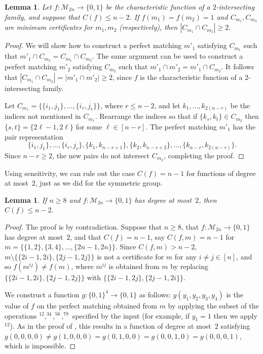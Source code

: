 \documentclass{article}
\newtheorem{lemma}[theorem]{Lemma}
\theoremstyle{definition}
\providecommand{\cM}{\mathcal{M}}
\begin{document}
\begin{lemma} \label{lem:2-int-coset-pms}
Let $f\colon \cM_{2n} \to \{0,1\}$ be the characteristic function of a $2$-intersecting family, and suppose that $C(f) \leq n-2$. If $f(m_1) = f(m_2) = 1$ and $C_{m_1},C_{m_2}$ are minimum certificates for $m_1,m_2$ (respectively), then $|C_{m_1} \cap C_{m_2}| \geq 2$.
\end{lemma}
\begin{proof}
We will show how to construct a perfect matching $m'_1$ satisfying $C_{m_1}$ such that $m'_1 \cap C_{m_2} = C_{m_1} \cap C_{m_2}$. The same argument can be used to construct a perfect matching $m'_2$ satisfying $C_{m_2}$ such that $m'_1 \cap m'_2 = m'_1 \cap C_{m_2}$. It follows that $|C_{m_1} \cap C_{m_2}| = |m'_1 \cap m'_2| \geq 2$, since $f$ is the characteristic function of a $2$-intersecting family.

Let $C_{m_1} = \bigl\{\{i_1,j_1\},\ldots,\{i_r,j_r\}\bigr\}$, where $r \leq n-2$, and let $k_1,\ldots,k_{2(n-r)}$ be the indices not mentioned in $C_{m_1}$. Rearrange the indices so that if $\{k_s,k_t\} \in C_{m_2}$ then $\{s,t\} = \{2\ell-1,2\ell\}$ for some $\ell \in [n-r]$. The perfect matching $m'_1$ has the pair representation
\[
 \{i_1,j_1\},\ldots,\{i_r,j_r\},\{k_1,k_{n-r+1}\},\{k_2,k_{n-r+2}\},\ldots,\{k_{n-r},k_{2(n-r)}\}.
\]
Since $n-r \geq 2$, the new pairs do not intersect $C_{m_2}$, completing the proof.
\end{proof}

Using sensitivity, we can rule out the case $C(f) = n-1$ for functions of degree at most~$2$, just as we did for the symmetric group.

\begin{lemma} \label{lem:C-bound-pms}
If $n \geq 8$ and $f\colon \cM_{2n} \to \{0,1\}$ has degree at most~$2$, then $C(f) \leq n-2$.
\end{lemma}
\begin{proof}
The proof is by contradiction. Suppose that $n \geq 8$, that $f\colon \cM_{2n} \to \{0,1\}$ has degree at most~$2$, and that $C(f) = n-1$, say $C(f,m) = n-1$ for $m = \bigl\{\{1,2\},\{3,4\},\ldots,\{2n-1,2n\}\bigr\}$. Since $C(f,m) > n-2$, $m \setminus \bigl\{\{2i-1,2i\},\{2j-1,2j\}\bigr\}$ is not a certificate for $m$ for any $i \neq j \in [n]$, and so $f(m^{ij}) \neq f(m)$, where $m^{ij}$ is obtained from $m$ by replacing $\bigl\{\{2i-1,2i\},\{2j-1,2j\}\bigr\}$ with $\bigl\{\{2i-1,2j\},\{2j-1,2i\}\bigr\}$.

We construct a function $g\colon \{0,1\}^4 \to \{0,1\}$ as follows: $g(y_1,y_2,y_3,y_4)$ is the value of $f$ on the perfect matching obtained from $m$ by applying the subset of the operations $^{12},^{34},^{56},^{78}$ specified by the input (for example, if $y_1 = 1$ then we apply $^{12}$). As in the proof of , this results in a function of degree at most~$2$ satisfying $g(0,0,0,0) \neq g(1,0,0,0) = g(0,1,0,0) = g(0,0,1,0) = g(0,0,0,1)$, which is impossible.
\end{proof}
\end{document}
